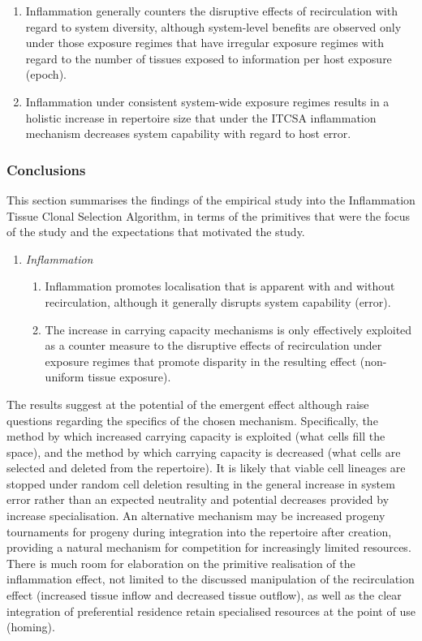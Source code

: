 \begin{enumerate}
	\item Inflammation generally counters the disruptive effects of recirculation with regard to system diversity, although system-level benefits are observed only under those exposure regimes that have irregular exposure regimes with regard to the number of tissues exposed to information per host exposure (epoch).	 
	\item Inflammation under consistent system-wide exposure regimes results in a holistic increase in repertoire size that under the ITCSA inflammation mechanism decreases system capability with regard to host error.
\end{enumerate}

%
%
\subsubsection{Conclusions}
This section summarises the findings of the empirical study into the Inflammation Tissue Clonal Selection Algorithm, in terms of the primitives that were the focus of the study and the expectations that motivated the study.

\begin{enumerate}	
	\item \emph{Inflammation}
	\begin{enumerate}
		\item Inflammation promotes localisation that is apparent with and without recirculation, although it generally disrupts system capability (error).
		\item The increase in carrying capacity mechanisms is only effectively exploited as a counter measure to the disruptive effects of recirculation under exposure regimes that promote disparity in the resulting effect (non-uniform tissue exposure).
	\end{enumerate}
\end{enumerate}

The results suggest at the potential of the emergent effect although raise questions regarding the specifics of the chosen mechanism. Specifically, the method by which increased carrying capacity is exploited (what cells fill the space), and the method by which carrying capacity is decreased (what cells are selected and deleted from the repertoire). It is likely that viable cell lineages are stopped under random cell deletion resulting in the general increase in system error rather than an expected neutrality and potential decreases provided by increase specialisation. An alternative mechanism may be increased progeny tournaments for progeny during integration into the repertoire after creation, providing a natural mechanism for competition for increasingly limited resources. There is much room for elaboration on the primitive realisation of the inflammation effect, not limited to the discussed manipulation of the recirculation effect (increased tissue inflow and decreased tissue outflow), as well as the clear integration of preferential residence retain specialised resources at the point of use (homing).

